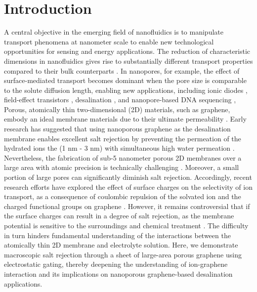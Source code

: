 \documentclass[journal=langd5,email=true, hyperref=true, keywords=false]{achemso}
\begin{document}
\section{Introduction}
\label{sec:intro}
A central objective in the emerging field of nanofluidics is to
manipulate transport phenomena at nanometer scale to enable new
technological opportunities for sensing and energy applications. The
reduction of characteristic dimensions in nanofluidics gives rise to
substantially different transport properties compared to their bulk
counterparts \cite{Schoch_2008}. In nanopores, for example, the effect
of surface-mediated transport becomes dominant when the pore size is
comparable to the solute diffusion length, enabling new applications,
including ionic diodes \cite{Karnik_2007}, field-effect transistors
\cite{Nam_2009}, desalination \cite{Heiranian_2015}, and
nanopore-based DNA sequencing \cite{Heerema_2016,Garaj_2013}, Porous,
atomically thin two-dimensional (2D) materials, such as graphene,
embody an ideal membrane materials due to their ultimate permeability
\cite{Suk_2010,Jiang_2009,Celebi_2014,Koenig_2012,Drahushuk_2012}. Early
research has suggested that using nanoporous graphene as the
desalination membrane enables excellent salt rejection by preventing
the permeation of the hydrated ions the (1 nm - 3 nm) with
simultaneous high water permeation
\cite{Cohen_Tanugi_2012,Suk_2014,Cohen_Tanugi_2014,Cohen_Tanugi_2015,O_Hern_2015,Surwade_2015}. Nevertheless,
the fabrication of sub-5 nanometer porous 2D membranes over a large
area with atomic precision is technically challenging
\cite{Suk_2014,Rollings_2016,O_Hern_2012,Wang_2017}. Moreover, a small
portion of large pores can significantly diminish salt rejection.
Accordingly, recent research efforts have explored the effect of
surface charges on the selectivity of ion transport, as a consequence
of coulombic repulsion of the solvated ion and the charged functional
groups on graphene \cite{Rollings_2016,Surwade_2014}. However, it
remains controversial that if the surface charges can result in a
degree of salt rejection, as the membrane potential is sensitive to
the surroundings and chemical treatment \cite{Li_2008}. The
difficulty in turn hinders fundamental understanding of the
interactions between the atomically thin 2D membrane and electrolyte
solution. Here, we demonstrate macroscopic salt rejection through a
sheet of large-area porous graphene using electrostatic gating,
thereby deepening the understanding of ion-graphene interaction and
its implications on nanoporous graphene-based desalination
applications.
\end{document}
